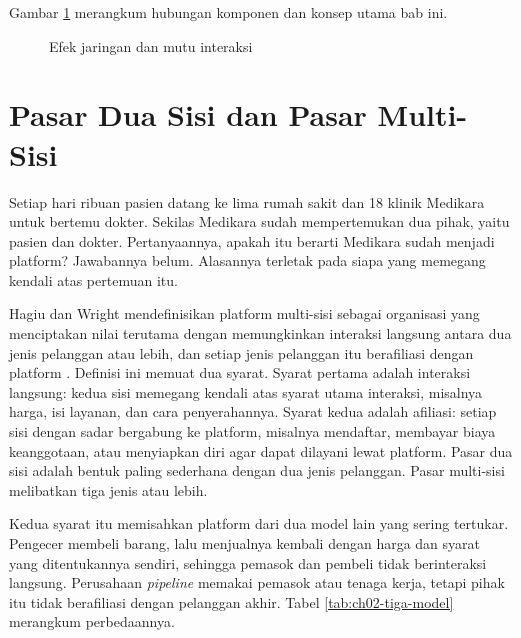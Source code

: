 Gambar \ref{fig:ch02-ilustrasi-bab} merangkum hubungan komponen dan konsep utama bab ini.
\begin{figure}[!htb]
  \centering
  
  \caption{Efek jaringan dan mutu interaksi}
  \label{fig:ch02-ilustrasi-bab}
\end{figure}

\section{Pasar Dua Sisi dan Pasar Multi-Sisi}

Setiap hari ribuan pasien datang ke lima rumah sakit dan 18 klinik Medikara
untuk bertemu dokter. Sekilas Medikara sudah mempertemukan dua pihak, yaitu
pasien dan dokter. Pertanyaannya, apakah itu berarti Medikara sudah menjadi
platform? Jawabannya belum. Alasannya terletak pada siapa yang memegang kendali
atas pertemuan itu.

Hagiu dan Wright mendefinisikan platform multi-sisi sebagai organisasi yang
menciptakan nilai terutama dengan memungkinkan interaksi langsung antara dua
jenis pelanggan atau lebih, dan setiap jenis pelanggan itu berafiliasi dengan
platform \cite{hagiu2015multisided}. Definisi ini memuat dua syarat. Syarat
pertama adalah interaksi langsung: kedua sisi memegang kendali atas syarat
utama interaksi, misalnya harga, isi layanan, dan cara penyerahannya. Syarat
kedua adalah afiliasi: setiap sisi dengan sadar bergabung ke platform, misalnya
mendaftar, membayar biaya keanggotaan, atau menyiapkan diri agar dapat dilayani
lewat platform. Pasar dua sisi adalah bentuk paling sederhana dengan dua jenis
pelanggan. Pasar multi-sisi melibatkan tiga jenis atau lebih.

Kedua syarat itu memisahkan platform dari dua model lain yang sering tertukar.
Pengecer membeli barang, lalu menjualnya kembali dengan harga dan syarat yang
ditentukannya sendiri, sehingga pemasok dan pembeli tidak berinteraksi
langsung. Perusahaan \textit{pipeline} memakai pemasok atau tenaga kerja,
tetapi pihak itu tidak berafiliasi dengan pelanggan akhir. Tabel
\ref{tab:ch02-tiga-model} merangkum perbedaannya.


